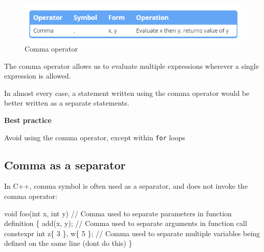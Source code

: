 \documentclass[
  letterpaper,
  DIV=11,
  numbers=noendperiod]{scrreprt}
\newenvironment{Shaded}{\begin{snugshade}}{\end{snugshade}}
\newcommand{\ControlFlowTok}[1]{\textcolor[rgb]{0.00,0.23,0.31}{#1}}
\newcommand{\DecValTok}[1]{\textcolor[rgb]{0.68,0.00,0.00}{#1}}
\newcommand{\ErrorTok}[1]{\textcolor[rgb]{0.68,0.00,0.00}{#1}}
\newcommand{\FunctionTok}[1]{\textcolor[rgb]{0.28,0.35,0.67}{#1}}
\newcommand{\NormalTok}[1]{\textcolor[rgb]{0.00,0.23,0.31}{#1}}
\newcommand{\SpecialCharTok}[1]{\textcolor[rgb]{0.37,0.37,0.37}{#1}}
\newcommand{\StringTok}[1]{\textcolor[rgb]{0.13,0.47,0.30}{#1}}
\begin{document}
\begin{figure}

{\centering \includegraphics{./figure/commaOperator.PNG}

}

\caption{Comma operator}

\end{figure}

The comma operator allows us to evaluate multiple expressions wherever a
single expression is allowed.

In almost every case, a statement written using the comma operator would
be better written as a separate statements.

\begin{tcolorbox}[enhanced jigsaw, toprule=.15mm, rightrule=.15mm, opacityback=0, breakable, leftrule=.75mm, colback=white, colframe=quarto-callout-tip-color-frame, arc=.35mm, left=2mm, bottomrule=.15mm]
\begin{minipage}[t]{5.5mm}
\textcolor{quarto-callout-tip-color}{\faLightbulb}
\end{minipage}%
\begin{minipage}[t]{\textwidth - 5.5mm}

\textbf{Best practice}\vspace{2mm}

Avoid using the comma operator, except within \texttt{for} loops

\end{minipage}%
\end{tcolorbox}

\hypertarget{comma-as-a-separator}{%
\subsection{Comma as a separator}\label{comma-as-a-separator}}

In C++, comma symbol is often used as a separator, and does not invoke
the comma operator:

\begin{Shaded}
\begin{Highlighting}[]
\NormalTok{void }\FunctionTok{foo}\NormalTok{(int x, int y) }\SpecialCharTok{/}\ErrorTok{/}\NormalTok{ Comma used to separate parameters }\ControlFlowTok{in} \ControlFlowTok{function}\NormalTok{ definition}
\NormalTok{\{}
    \FunctionTok{add}\NormalTok{(x, y); }\SpecialCharTok{/}\ErrorTok{/}\NormalTok{ Comma used to separate arguments }\ControlFlowTok{in} \ControlFlowTok{function}\NormalTok{ call}
\NormalTok{    constexpr int z\{ }\DecValTok{3}\NormalTok{ \}, w\{ }\DecValTok{5}\NormalTok{ \}; }\SpecialCharTok{/}\ErrorTok{/}\NormalTok{ Comma used to separate multiple variables being defined on the same }\FunctionTok{line}\NormalTok{ (don}\StringTok{\textquotesingle{}t do this)}
\StringTok{\}}
\end{Highlighting}
\end{Shaded}
\end{document}

